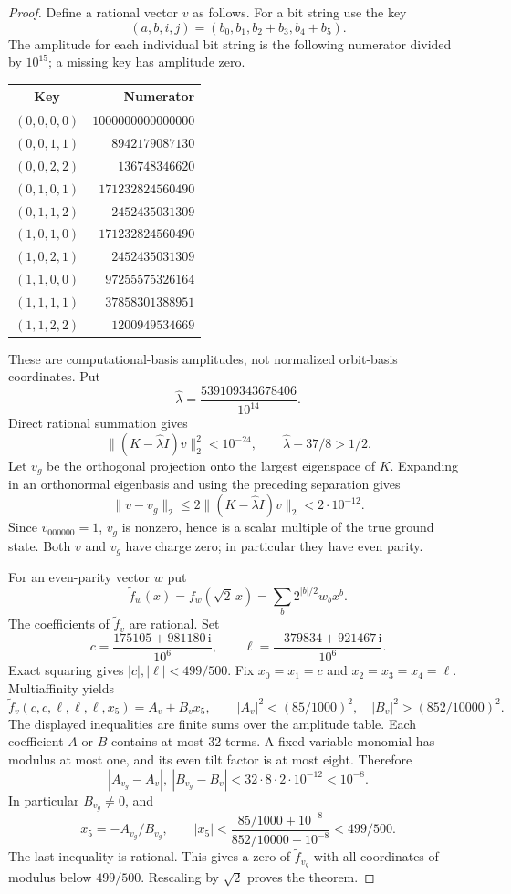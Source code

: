 \documentclass[reqno]{amsart}
\theoremstyle{definition}
\theoremstyle{remark}
\begin{document}
\begin{proof}
Define a rational vector $v$ as follows. For a bit string use the key
\[
 (a,b,i,j)=(b_0,b_1,b_2+b_3,b_4+b_5).
\]
The amplitude for each individual bit string is the following
numerator divided by $10^{15}$; a missing key has amplitude zero.
\begin{center}
\begin{tabular}{cr}
\toprule
Key & Numerator\\
\midrule
$(0,0,0,0)$ & $1000000000000000$\\
$(0,0,1,1)$ & $8942179087130$\\
$(0,0,2,2)$ & $136748346620$\\
$(0,1,0,1)$ & $171232824560490$\\
$(0,1,1,2)$ & $2452435031309$\\
$(1,0,1,0)$ & $171232824560490$\\
$(1,0,2,1)$ & $2452435031309$\\
$(1,1,0,0)$ & $97255575326164$\\
$(1,1,1,1)$ & $37858301388951$\\
$(1,1,2,2)$ & $1200949534669$\\
\bottomrule
\end{tabular}
\end{center}
These are computational-basis amplitudes, not normalized orbit-basis
coordinates. Put
\[
 \widehat\lambda=\frac{539109343678406}{10^{14}}.
\]
Direct rational summation gives
\[
 \|(K-\widehat\lambda I)v\|_2^2<10^{-24},
 \qquad \widehat\lambda-37/8>1/2.
\]
Let $v_g$ be the orthogonal projection onto the largest eigenspace
of $K$. Expanding in an orthonormal eigenbasis and using the
preceding separation gives
\[
 \|v-v_g\|_2
 \leq2\|(K-\widehat\lambda I)v\|_2<2\cdot10^{-12}.
\]
Since $v_{000000}=1$, $v_g$ is nonzero, hence is a scalar multiple
of the true ground state. Both $v$ and $v_g$ have charge zero;
in particular they have even parity.

For an even-parity vector $w$ put
\[
 \widetilde f_w(x)=f_w(\sqrt2\,x)
        =\sum_b2^{|b|/2}w_bx^b.
\]
The coefficients of $\widetilde f_v$ are rational. Set
\[
 c=\frac{175105+981180\,\mathrm i}{10^6},\qquad
 \ell=\frac{-379834+921467\,\mathrm i}{10^6}.
\]
Exact squaring gives $|c|,|\ell|<499/500$. Fix
$x_0=x_1=c$ and $x_2=x_3=x_4=\ell$. Multiaffinity yields
\[
 \widetilde f_v(c,c,\ell,\ell,\ell,x_5)=A_v+B_vx_5,
 \qquad
 |A_v|^2<(85/1000)^2,\quad |B_v|^2>(852/10000)^2 .
\]
The displayed inequalities are finite sums over the amplitude table.
Each coefficient $A$ or $B$ contains at most $32$ terms. A fixed-variable
monomial has modulus at most one, and its even tilt factor is at most
eight. Therefore
\[
 |A_{v_g}-A_v|,\ |B_{v_g}-B_v|
 <32\cdot8\cdot2\cdot10^{-12}<10^{-8}.
\]
In particular $B_{v_g}\neq0$, and
\[
 x_5=-A_{v_g}/B_{v_g},\qquad
 |x_5|<
 \frac{85/1000+10^{-8}}{852/10000-10^{-8}}<499/500.
\]
The last inequality is rational. This gives a zero of
$\widetilde f_{v_g}$ with all coordinates of modulus below $499/500$.
Rescaling by $\sqrt2$ proves the theorem.
\end{proof}
\end{document}
